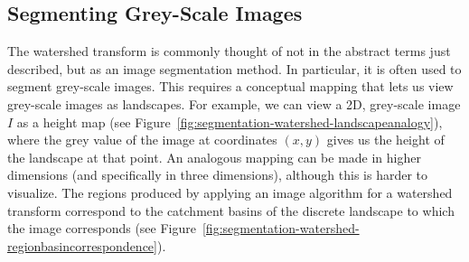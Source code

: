\subsection{Segmenting Grey-Scale Images}
\label{subsec:segmentation-watershed-greyscale}

The watershed transform is commonly thought of not in the abstract terms just described, but as an image segmentation method. In particular, it is often used to segment grey-scale images. This requires a conceptual mapping that lets us view grey-scale images as landscapes. For example, we can view a 2D, grey-scale image $I$ as a height map (see Figure~\ref{fig:segmentation-watershed-landscapeanalogy}), where the grey value of the image at coordinates $(x,y)$ gives us the height of the landscape at that point. An analogous mapping can be made in higher dimensions (and specifically in three dimensions), although this is harder to visualize. The regions produced by applying an image algorithm for a watershed transform correspond to the catchment basins of the discrete landscape to which the image corresponds (see Figure~\ref{fig:segmentation-watershed-regionbasincorrespondence}).


